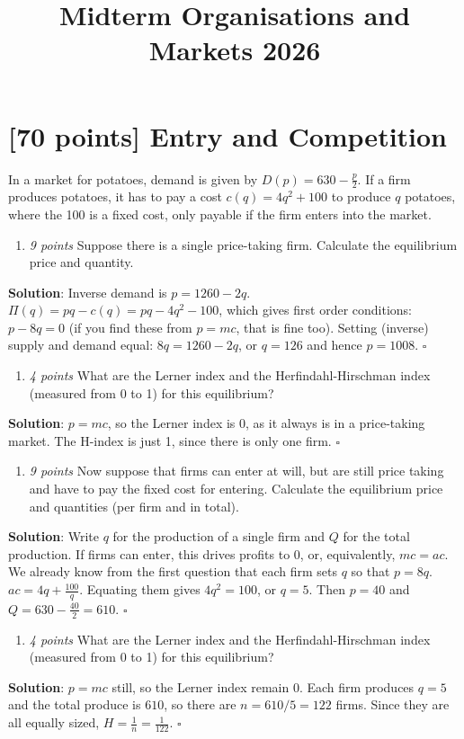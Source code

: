 \documentclass{article}
\title{Midterm Organisations and Markets 2026}
\author{}
\date{}
\begin{document}
\maketitle

\section{[70 points] Entry and Competition}
In a market for potatoes, demand is given by $D(p)=630-\frac p2$. If a firm produces potatoes, it has to pay a cost $c(q)=4q^{2}+100$ to produce $q$ potatoes, where the 100 is a fixed cost, only payable if the firm enters into the market.

\begin{enumerate}[label=(\alph*)]
\item \textit{9 points} Suppose there is a single price-taking firm. Calculate the equilibrium price and quantity. \end{enumerate}
\textbf{Solution}:
Inverse demand is $p=1260-2q$. 
$\Pi(q)=pq-c(q)=pq-4q^{2}-100$, which gives first order conditions: $p-8q=0$ (if you find these from $p=mc$, that is fine too). Setting (inverse) supply and demand equal: $8q=1260-2q$, or $q=126$ and hence $p=1008$. $\square$

\begin{enumerate}[resume*]
\item \textit{4 points }What are the Lerner index and the Herfindahl-Hirschman index (measured from 0 to 1) for this equilibrium?\end{enumerate}
\textbf{Solution}:
$p=mc$, so the Lerner index is 0, as it always is in a price-taking market. The H-index is just 1, since there is only one firm. $\square$

\begin{enumerate}[resume*]
\item \textit{9 points }Now suppose that firms can enter at will, but are still price taking and have to pay the fixed cost for entering. Calculate the equilibrium price and quantities (per firm and in total).\end{enumerate}
\textbf{Solution}:
Write $q$ for the production of a single firm and $Q$ for the total production. If firms can enter, this drives profits to 0, or, equivalently, $mc=ac$. We already know from the first question that each firm sets $q$ so that $p=8q$. $ac=4q+\frac{100}q$. Equating them gives $4q^{2}=100$, or $q=5$. Then $p=40$ and $Q=630-\frac {40}2=610$. $\square$

\begin{enumerate}[resume*]
\item \textit{4 points }What are the Lerner index and the Herfindahl-Hirschman index (measured from 0 to 1) for this equilibrium?\end{enumerate}
\textbf{Solution}:
$p=mc$ still, so the Lerner index remain 0. Each firm produces $q=5$ and the total produce is $610$, so there are $n=610/5=122$ firms. Since they are all equally sized, $H=\frac 1n=\frac 1{122}$. $\square$
\end{document}
